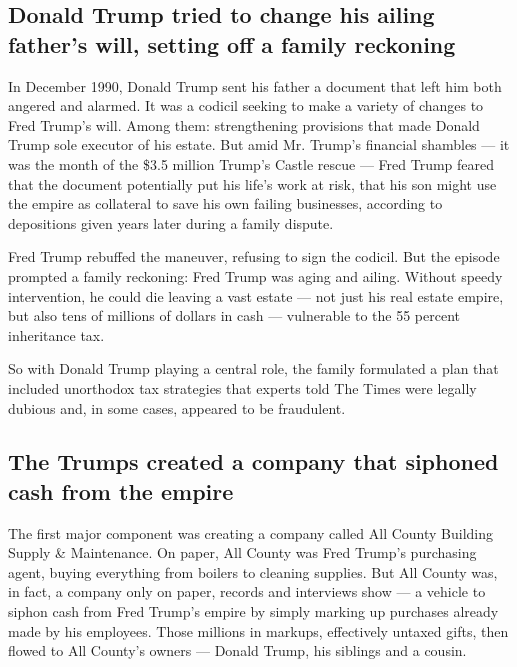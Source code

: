 \hypertarget{donald-trump-tried-to-change-his-ailing-fathers-will-setting-off-a-family-reckoning}{%
\subsection{Donald Trump tried to change his ailing father's will,
setting off a family
reckoning}\label{donald-trump-tried-to-change-his-ailing-fathers-will-setting-off-a-family-reckoning}}

In December 1990, Donald Trump sent his father a document that left him
both angered and alarmed. It was a codicil seeking to make a variety of
changes to Fred Trump's will. Among them: strengthening provisions that
made Donald Trump sole executor of his estate. But amid Mr. Trump's
financial shambles --- it was the month of the \$3.5 million Trump's
Castle rescue --- Fred Trump feared that the document potentially put
his life's work at risk, that his son might use the empire as collateral
to save his own failing businesses, according to depositions given years
later during a family dispute.

Fred Trump rebuffed the maneuver, refusing to sign the codicil. But the
episode prompted a family reckoning: Fred Trump was aging and ailing.
Without speedy intervention, he could die leaving a vast estate --- not
just his real estate empire, but also tens of millions of dollars in
cash --- vulnerable to the 55 percent inheritance tax.

So with Donald Trump playing a central role, the family formulated a
plan that included unorthodox tax strategies that experts told The Times
were legally dubious and, in some cases, appeared to be fraudulent.

\hypertarget{the-trumps-created-a-company-that-siphoned-cash-from-the-empire}{%
\subsection{The Trumps created a company that siphoned cash from the
empire}\label{the-trumps-created-a-company-that-siphoned-cash-from-the-empire}}

The first major component was creating a company called All County
Building Supply \& Maintenance. On paper, All County was Fred Trump's
purchasing agent, buying everything from boilers to cleaning supplies.
But All County was, in fact, a company only on paper, records and
interviews show --- a vehicle to siphon cash from Fred Trump's empire by
simply marking up purchases already made by his employees. Those
millions in markups, effectively untaxed gifts, then flowed to All
County's owners --- Donald Trump, his siblings and a cousin.

